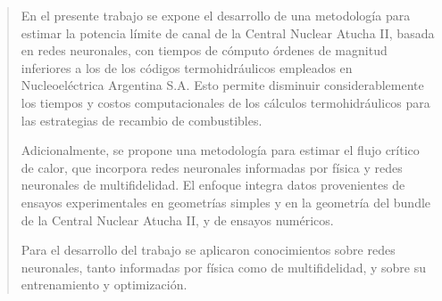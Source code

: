 \begin{abstract}
\addchaptertocentry{\abstractname} %
En el presente trabajo se expone el desarrollo de una metodología para estimar la potencia límite de canal de la Central Nuclear Atucha II, basada en redes neuronales, con tiempos de cómputo órdenes de magnitud inferiores a los de los códigos termohidráulicos empleados en Nucleoeléctrica Argentina S.A. Esto permite disminuir considerablemente los tiempos y costos computacionales de los cálculos termohidráulicos para las estrategias de recambio de combustibles. 

Adicionalmente, se propone una metodología para estimar el flujo crítico de calor, que incorpora redes neuronales informadas por física y redes neuronales de multifidelidad. El enfoque integra datos provenientes de ensayos experimentales en geometrías simples y en la geometría del bundle de la Central Nuclear Atucha II, y de ensayos numéricos. 

Para el desarrollo del trabajo se aplicaron conocimientos sobre redes neuronales, tanto informadas por física como de multifidelidad, y sobre su entrenamiento y optimización.



\end{abstract}